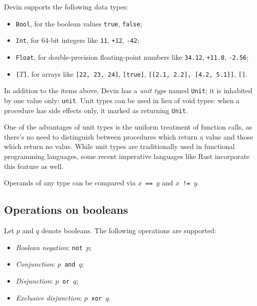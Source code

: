 \documentclass[11pt, american, draft]{PhdThesis}
\begin{document}
  Devin supports the following data types:

  \begin{itemize}[noitemsep,topsep=0pt]
    \item \verb$Bool$, for the boolean values \verb$true$, \verb$false$;

    \item \verb$Int$, for 64-bit integers like \verb$11$, \verb$+12$, \verb$-42$;

    \item \verb$Float$, for double-precision floating-point numbers like \verb$34.12$, \verb$+11.0$,
    \verb$-2.56$;

    \item \mbox{\texttt{[$T$]}}, for arrays like \verb$[22, 23, 24]$, \verb$[true]$,
    \verb$[[2.1, 2.2], [4.2, 5.1]]$, \verb$[]$.
  \end{itemize}

  In addition to the items above, Devin has a \emph{unit type} named \verb$Unit$; it is inhabited by
  one value only: \verb$unit$. Unit types can be used in lieu of void types: when a procedure has
  side effects only, it marked as returning \verb$Unit$.

  One of the advantages of unit types is the uniform treatment of function calls, as there's no need
  to distinguish between procedures which return a value and those which return no value. While unit
  types are traditionally used in functional programming languages, some recent imperative languages
  like Rust incorporate this feature as well.

  Operands of any type can be compared via \mbox{\texttt{$x$ == $y$}} and
  \mbox{\texttt{$x$ != $y$}}.

  \subsection{Operations on booleans}

  Let $p$ and $q$ denote booleans. The following operations are supported:

  \begin{itemize}[noitemsep,topsep=0pt]
    \item \emph{Boolean negation}: \mbox{\texttt{not $p$}};
    \item \emph{Conjunction}: \mbox{\texttt{$p$ and $q$}};
    \item \emph{Disjunction}: \mbox{\texttt{$p$ or $q$}};
    \item \emph{Exclusive disjunction}: \mbox{\texttt{$p$ xor $q$}}.
  \end{itemize}
\end{document}
